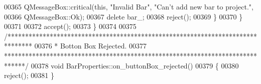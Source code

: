 \begin{DoxyCode}
00365       QMessageBox::critical(\textcolor{keyword}{this}, \textcolor{stringliteral}{"Invalid Bar"}, \textcolor{stringliteral}{"Can't add new bar to project."},
00366                             QMessageBox::Ok);
00367       \textcolor{keyword}{delete} bar\_;
00368       reject();
00369     \}
00370   \}
00371 
00372   accept();
00373 \}
00374 
00375 \textcolor{comment}{/*******************************************************************************}
00376 \textcolor{comment}{ * Botton Box Rejected.}
00377 \textcolor{comment}{ ******************************************************************************/}
00378 \textcolor{keywordtype}{void} BarProperties::on\_buttonBox\_rejected()
00379 \{
00380   reject();
00381 \}
\end{DoxyCode}
